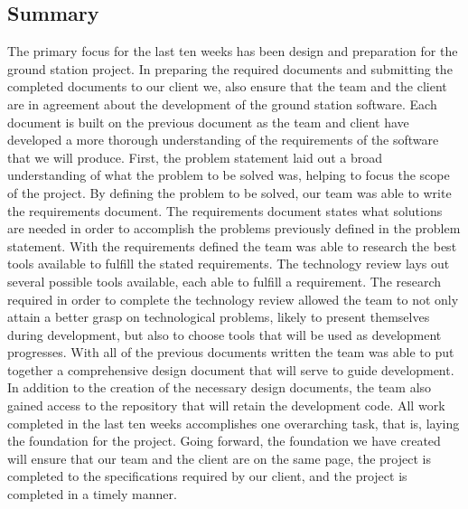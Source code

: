 \subsection{Summary}
The primary focus for the last ten weeks has been design and preparation for the ground station project.
In preparing the required documents and submitting the completed documents to our client we, also ensure that the team and the client are in agreement about the development of the ground station software.
Each document is built on the previous document as the team and client have developed a more thorough understanding of the requirements of the software that we will produce.
First, the problem statement laid out a broad understanding of what the problem to be solved was, helping to focus the scope of the project.
By defining the problem to be solved, our team was able to write the requirements document.
The requirements document states what solutions are needed in order to accomplish the problems previously defined in the problem statement.
With the requirements defined the team was able to research the best tools available to fulfill the stated requirements.
The technology review lays out several possible tools available, each able to fulfill a requirement.
The research required in order to complete the technology review allowed the team to not only attain a better grasp on technological problems, likely to present themselves during development, but also to choose tools that will be used as development progresses.
With all of the previous documents written the team was able to put together a comprehensive design document that will serve to guide development.
In addition to the creation of the necessary design documents, the team also gained access to the repository that will retain the development code.
All work completed in the last ten weeks accomplishes one overarching task, that is, laying the foundation for the project.
Going forward, the foundation we have created will ensure that our team and the client are on the same page, the project is completed to the specifications required by our client, and the project is completed in a timely manner.